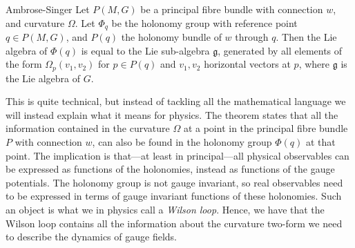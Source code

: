 \medskip
\begin{mytheo}{Ambrose-Singer}{}
Let $P(M,G)$ be a principal fibre bundle with connection $w$, and curvature $\Omega$. Let $\Phi_{q}$ be the holonomy group with reference point $q\in P(M,G)$, and $P(q)$ the holonomy bundle of $w$ through $q$. Then the Lie algebra of $\Phi(q)$ is equal to the Lie sub-algebra $\mathfrak{g}$, generated by all elements of the form $\Omega_{p}(v_1,v_2)$ for $p\in P(q)$ and $v_1,v_2$ horizontal vectors at $p$, where $\mathfrak{g}$ is the Lie algebra of $G$. 
\end{mytheo}\noindent
This is quite technical, but instead of tackling all the mathematical language we will instead explain what it means for physics. The theorem states that all the information contained in the curvature $\Omega$ at a point in the principal fibre bundle $P$ with connection $w$, can also be found in the holonomy group $\Phi(q)$ at that point. The implication is that---at least in principal---all physical observables can be expressed as functions of the holonomies, instead as functions of the gauge potentials. The holonomy group is not gauge invariant, so real observables need to be expressed in terms of gauge invariant functions of these holonomies. Such an object is what we in physics call a \emph{Wilson loop}. Hence, we have that the Wilson loop contains all the information about the curvature two-form we need to describe the dynamics of gauge fields.